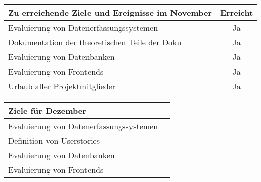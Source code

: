 \begin{tabularx}{\textwidth}{Xc}
    \arrayrulecolor{OliveGreen}
    \toprule
    {\bfseries Zu erreichende Ziele und Ereignisse im November} & {\bfseries Erreicht} \\
    \midrule[2pt]
    Evaluierung von Datenerfassungssystemen                     &Ja                    \\
    \rowcolor{OliveGreen!15}
    Dokumentation der theoretischen Teile der Doku              &Ja                    \\
    \rowcolor{White}
    Evaluierung von Datenbanken                                 &Ja                    \\
    \rowcolor{OliveGreen!15}
    Evaluierung von Frontends                                   &Ja                    \\
    \rowcolor{White}
    Urlaub aller Projektmitglieder                              &Ja                    \\
    \bottomrule[2pt]
\end{tabularx}
%
\vspace{1cm}
%
\begin{tabularx}{\textwidth}{Xc}
    \arrayrulecolor{OliveGreen}
    \toprule
    {\bfseries Ziele für Dezember}                       &                      \\
    \midrule[2pt]
    Evaluierung von Datenerfassungssystemen              &                      \\
    \rowcolor{OliveGreen!15}
    Definition von Userstories                           &                      \\
    \rowcolor{White}
    Evaluierung von Datenbanken                          &                      \\
    \rowcolor{OliveGreen!15}
    Evaluierung von Frontends                            &                      \\
\end{tabularx}
